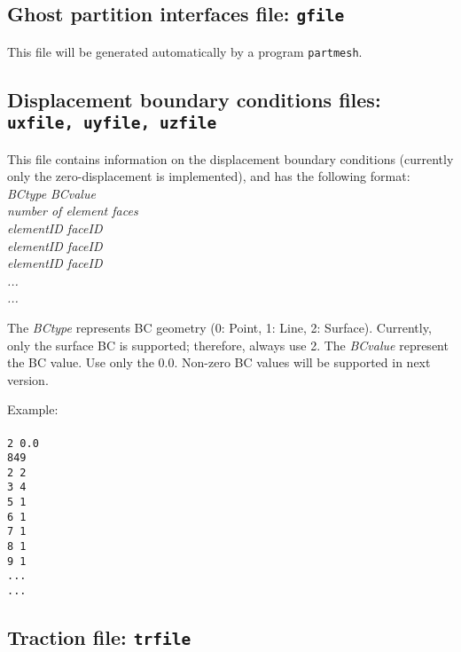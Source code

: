 \subsection{Ghost partition interfaces file: \texttt{gfile}}


This file will be generated automatically by a program \texttt{partmesh}.\\

\subsection{Displacement boundary conditions files: \texttt{uxfile, uyfile, uzfile}}

This file contains information on the displacement boundary conditions (currently only the zero-displacement is implemented), and has the following format:\\

\emph{BCtype} \emph{BCvalue}\\
\emph{number of element faces}\\
\emph{elementID faceID \\
elementID faceID \\
elementID faceID \\
...\\
...\\}

The \emph{BCtype} represents BC geometry (0: Point, 1: Line, 2: Surface). Currently, only the surface BC is supported; therefore, always use 2. The \emph{BCvalue} represent the BC value. Use only the $0.0$. Non-zero BC values will be supported in next version.

Example:\\
\\
\texttt{2 0.0\\
849\\
2 2\\
3 4\\
5 1\\
6 1\\
7 1\\
8 1\\
9 1\\
...\\
...}\\

\subsection{Traction file: \texttt{trfile}}


